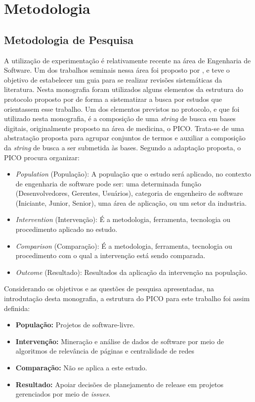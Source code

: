 \chapter{Metodologia}
\label{met}
\section{Metodologia de Pesquisa}
\label{met:pes}

A utilização de experimentação é relativamente recente na área de Engenharia de Software. Um dos trabalhos seminais nessa área foi proposto por , e teve o objetivo de estabelecer um guia para se realizar revisões sistemáticas da literatura. Nesta monografia foram utilizados alguns elementos da estrutura do protocolo proposto por  de forma a sistematizar a busca por estudos que orientassem esse trabalho. Um dos elementos previstos no protocolo, e que foi utilizado nesta monografia, é a composição de uma \textit{string} de busca em bases digitais, originalmente proposto na área de medicina, o PICO. \cite{citeulike:10757239} Trata-se de uma abstratação proposta para agrupar conjuntos de termos e auxiliar a composição da \textit{string} de busca a ser submetida às bases. Segundo a adaptação proposta, o PICO procura organizar:

\begin{itemize}
    \item \textit{Population} (População): A população que o estudo será aplicado, no contexto de engenharia de software pode ser: uma determinada função (Desenvolvedores, Gerentes, Usuários), categoria de engenheiro de software (Iniciante, Junior, Senior), uma área de aplicação, ou um setor da industria.
    \item \textit{Intervention} (Intervenção): É a metodologia, ferramenta, tecnologia ou procedimento aplicado no estudo.
    \item \textit{Comparison} (Comparação): É a metodologia, ferramenta, tecnologia ou procedimento com o qual a intervenção está sendo comparada.
    \item \textit{Outcome} (Resultado): Resultados da aplicação da intervenção na população.
\end{itemize}

Considerando os objetivos e as questões de pesquisa apresentadas, na introdutação desta monografia, a estrutura do PICO para este trabalho foi assim definida:

\begin{itemize}
    \item \textbf{População:} Projetos de software-livre.
    \item \textbf{Intervenção:} Mineração e análise de dados de software por meio de algoritmos de relevância de páginas e centralidade de redes
    \item \textbf{Comparação:} Não se aplica a este estudo.
    \item \textbf{Resultado:} Apoiar decisões de planejamento de release em projetos gerenciados por meio de \textit{issues}.
\end{itemize}


